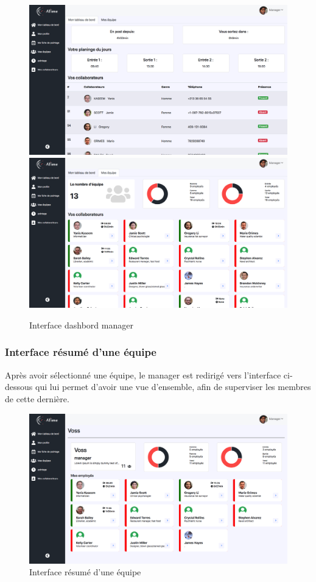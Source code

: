 \begin{figure}[h!]
    \centering
    \includegraphics[scale=0.326 ]{images/interface/dashbord_manager1.png}
    \includegraphics[scale=0.326 ]{images/interface/dashbord_manager.png}
    \caption{Interface dashbord manager}
    \label{fig96}
\end{figure}

\subsubsection*{Interface résumé d'une équipe}
Après avoir sélectionné une équipe, le manager est redirigé vers l'interface 
ci-dessous qui lui permet d'avoir une vue d'ensemble, afin de superviser les 
membres de cette dernière.

\begin{figure}[h!]
    \centering
    \includegraphics[scale=0.35 ]{images/interface/team_view.png}
    \caption{Interface résumé d'une équipe}
    \label{fig97}
\end{figure}

